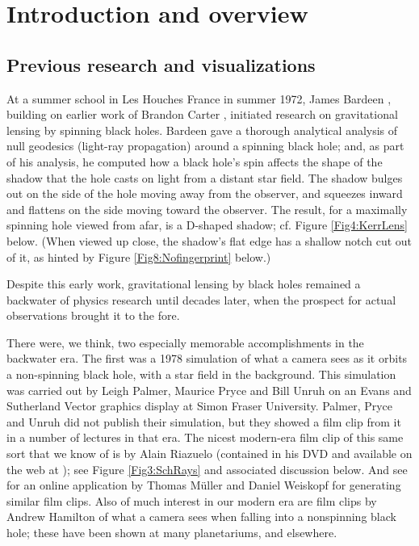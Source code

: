 \documentclass[12pt]{iopart}
\begin{document}
\section{Introduction and overview}
\label{sec:Intro}

\subsection{Previous research and visualizations}
\label{subsec:Previous}

At a summer school in Les Houches France in summer 1972, James  Bardeen \cite{Bardeen73},  building on earlier work of  Brandon Carter \cite{Carter68}, initiated research on gravitational lensing by spinning black holes.  
Bardeen gave a thorough 
analytical analysis of null geodesics (light-ray propagation) around a spinning black hole; and,  
as part of his analysis, he computed how a black hole's spin affects the shape of
the shadow that the hole casts on light from a distant star field.  The shadow bulges out on the side
of the hole moving away from the observer, and squeezes inward and flattens 
on the side moving toward the observer.  The result, for a maximally spinning hole viewed from afar, is a D-shaped shadow;  cf. Figure \ref{Fig4:KerrLens} below. (When viewed up close, the shadow's flat edge has a shallow notch cut out of it, as hinted
by Figure \ref{Fig8:Nofingerprint} below.)

Despite this early work, gravitational lensing by black holes remained a backwater of physics research until decades later, when the prospect for actual observations brought it
to the fore.

There were, we think,  two especially memorable accomplishments in the backwater era.  The first was  a 1978 simulation of what a camera sees as it orbits a non-spinning black hole, with a star field in the background.  This simulation was carried out by  Leigh Palmer, Maurice Pryce and Bill Unruh \cite{Unruh78} on an Evans and Sutherland Vector
graphics display at Simon Fraser University.  Palmer, Pryce and Unruh did not publish their simulation, but
they showed a film clip from it in a number of lectures in that era.  The nicest modern-era film clip of this same sort that we know of is by  Alain Riazuelo (contained in his DVD \cite{RiazueloDVD} and available on the web at \cite{Riazuelo14}); see Figure \ref{Fig3:SchRays} and associated
discussion below.  And see \cite{MullerWeiskopf} for an online application
by Thomas M\"uller and Daniel Weiskopf for generating similar film clips.  Also of much interest in our modern
era are film clips by Andrew Hamilton \cite{Hamilton14} of what a camera sees when falling into
a nonspinning black hole; these have been shown at many planetariums, and elsewhere.
\end{document}
